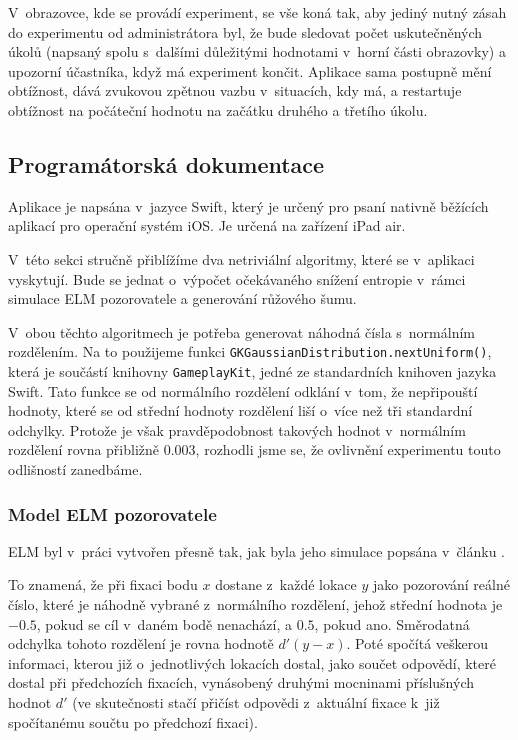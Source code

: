 \bigskip
V~obrazovce, kde se provádí experiment, se vše koná tak, aby jediný nutný zásah
do experimentu od administrátora byl, že bude sledovat počet uskutečněných
úkolů (napsaný spolu s~dalšími důležitými hodnotami v~horní části obrazovky) a
upozorní účastníka, když má experiment končit. Aplikace sama postupně mění
obtížnost, dává zvukovou zpětnou vazbu v~situacích, kdy má, a restartuje
obtížnost na počáteční hodnotu na začátku druhého a třetího úkolu.

\subsection*{Programátorská dokumentace}

Aplikace je napsána v~jazyce Swift, který je určený pro psaní nativně běžících
aplikací pro operační systém iOS. Je určená na zařízení iPad air.

V~této sekci stručně přiblížíme dva netriviální algoritmy, které se v~aplikaci
vyskytují. Bude se jednat o~výpočet očekávaného snížení entropie v~rámci
simulace ELM pozorovatele a generování růžového šumu.

V~obou těchto algoritmech je potřeba generovat náhodná čísla s~normálním
rozdělením. Na to použijeme funkci {\tt GKGaussianDistribution.nextUniform()},
která je součástí knihovny {\tt GameplayKit}, jedné ze standardních knihoven
jazyka Swift. Tato funkce se od normálního rozdělení odklání v~tom, že
nepřipouští hodnoty, které se od střední hodnoty rozdělení liší o~více než tři
standardní odchylky. Protože je však pravděpodobnost takových hodnot
v~normálním rozdělení rovna přibližně $0.003$, rozhodli jsme se, že ovlivnění
experimentu touto odlišností zanedbáme.

\subsubsection*{Model ELM pozorovatele}

ELM  byl v~práci vytvořen přesně tak, jak byla jeho simulace popsána v~článku \citep{Najemnik09}. 

To znamená, že při fixaci bodu $x$  dostane z~každé lokace $y$ jako pozorování reálné
číslo, které je náhodně vybrané z~normálního rozdělení, jehož střední hodnota
je $-0.5$, pokud se cíl v~daném bodě nenachází, a $0.5$, pokud ano. Směrodatná
odchylka tohoto rozdělení je rovna hodnotě $d'(y-x)$. Poté
spočítá veškerou informaci, kterou již o~jednotlivých lokacích dostal, jako
součet odpovědí, které dostal při předchozích fixacích, vynásobený druhými
mocninami příslušných hodnot $d'$ (ve skutečnosti stačí přičíst odpovědi
z~aktuální fixace k~již spočítanému součtu po předchozí fixaci).

